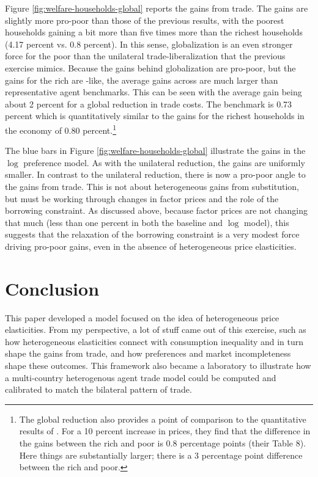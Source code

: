 \documentclass[12pt,pdftex]{article}
\begin{document}
\begin{onehalfspacing}
Figure \ref{fig:welfare-households-global} reports the gains from trade. The gains are slightly more pro-poor than those of the previous results, with the poorest households gaining a bit more than five times more than the richest households (4.17 percent vs. 0.8 percent). In this sense, globalization is an even stronger force for the poor than the unilateral trade-liberalization that the previous exercise mimics. Because the gains behind globalization are pro-poor, but the gains for the rich are \citet{arkolakis2012new}-like, the average gains across are much larger than representative agent benchmarks. This can be seen with the average gain being about 2 percent for a global reduction in trade costs. The \citet{arkolakis2012new} benchmark is 0.73 percent which is quantitatively similar to the gains for the richest households in the economy of 0.80 percent.\footnote{The global reduction also provides a point of comparison to the quantitative results of \citet{auer2022unequal}. For a 10 percent increase in prices, they find that the difference in the gains between the rich and poor is 0.8 percentage points (their Table 8). Here things are substantially larger; there is a 3 percentage point difference between the rich and poor.}


The blue bars in Figure \ref{fig:welfare-households-global} illustrate the gains in the $\log$ preference model. As with the unilateral reduction, the gains are uniformly smaller. In contrast to the unilateral reduction, there is now a pro-poor angle to the gains from trade. This is not about heterogeneous gains from substitution, but must be working through changes in factor prices and the role of the borrowing constraint. As discussed above, because factor prices are not changing that much (less than one percent in both the baseline and $\log$ model), this suggests that the relaxation of the borrowing constraint is a very modest force driving pro-poor gains, even in the absence of heterogeneous price elasticities.

\section{Conclusion}

This paper developed a model focused on the idea of heterogeneous price elasticities. From my perspective, a lot of stuff came out of this exercise, such as how heterogeneous elasticities connect with consumption inequality and in turn shape the gains from trade, and how preferences and market incompleteness shape these outcomes. This framework also became a laboratory to illustrate how a multi-country heterogenous agent trade model could be computed and calibrated to match the bilateral pattern of trade.


\end{onehalfspacing}
\end{document}
